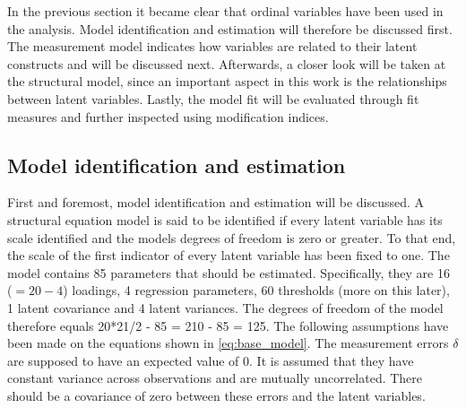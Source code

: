 \documentclass[11pt]{article}
\begin{document}
In the previous section it became clear that ordinal variables have been used in
the analysis. Model identification and estimation will therefore be discussed
first. The measurement model indicates how variables are related to their latent
constructs and will be discussed next. Afterwards, a closer look will be taken
at the structural model, since an important aspect in this work is the
relationships between latent variables. Lastly, the model fit will be evaluated
through fit measures and further inspected using modification indices.

\subsection{Model identification and estimation}

First and foremost, model identification and estimation will be discussed.
A structural equation model is said to be identified if every latent variable
has its scale identified and the models degrees of freedom is zero or greater.
To that end, the scale of the first indicator of every latent variable has been
fixed to one. The model contains 85 parameters that should be estimated.
Specifically, they are 16 ($=20 - 4$) loadings, 4 regression parameters, 60
thresholds (more on this later), 1 latent covariance and 4 latent variances.
The degrees of freedom of the model therefore equals 20*21/2 - 85 = 210 - 85
= 125.
The following assumptions have been made on the equations shown
in \ref{eq:base_model}. The measurement errors $\delta$ are supposed to have an
expected value of 0. It is assumed that they have constant variance across
observations and are mutually uncorrelated. There should be a covariance of zero
between these errors and the latent variables.
\end{document}
